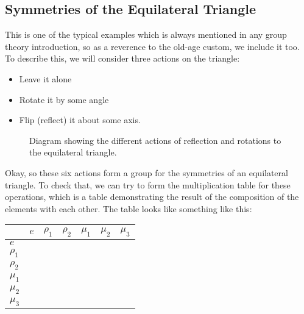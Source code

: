 \subsection{Symmetries of the Equilateral Triangle}
This is one of the typical examples which is always mentioned in any group theory introduction, so as a reverence to the old-age custom, we include it too. To describe this, we will consider three actions on the triangle:
\begin{itemize}
    \item Leave it alone
    \item Rotate it by some angle
    \item Flip (reflect) it about some axis.
\end{itemize}
\begin{figure}[H]
    \centering 
    
    \caption{Diagram showing the different actions of reflection and rotations to the equilateral triangle.}
\end{figure}
Okay, so these six actions form a group for the symmetries of an equilateral triangle. To check that, we can try to form the multiplication table for these operations, which is a table demonstrating the result of the composition of the elements with each other. The table looks like something like this:
\begin{table}[H]
\centering
\renewcommand{\arraystretch}{1.0} %
\begin{tabular}{|
    >{\centering\arraybackslash}p{}|
    >{\centering\arraybackslash}p{}|
    >{\centering\arraybackslash}p{}|
    >{\centering\arraybackslash}p{}|
    >{\centering\arraybackslash}p{}|
    >{\centering\arraybackslash}p{}|
    >{\centering\arraybackslash}p{}|
    }
\hline
\text{\Large $*$} & $e$ & $\rho_1$ & $\rho_2$ & $\mu_1$ & $\mu_2$ & $\mu_3$ \\
\hline
$e $     &   &   &   &   &   &   \\
\hline
$\rho_1$ &   &   &   &   &   &   \\
\hline
$\rho_2$ &   &   &   &   &   &   \\
\hline
$\mu_1$  &   &   &   &   &   &   \\
\hline
$\mu_2$  &   &   &   &   &   &   \\
\hline
$\mu_3$  &   &   &   &   &   &   \\
\hline
\end{tabular}
\end{table}
